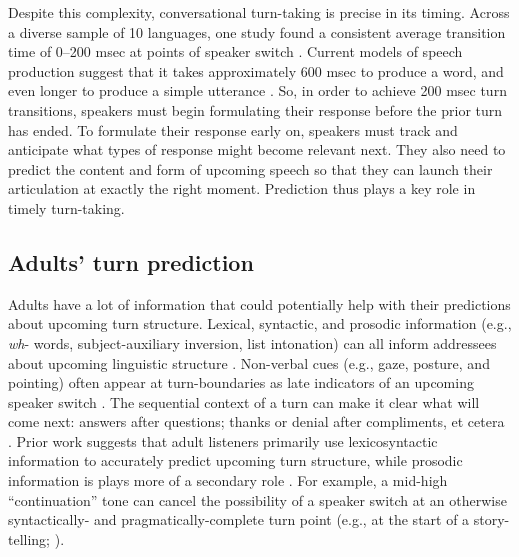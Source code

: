 \documentclass[authoryear, 12pt]{elsarticle}
\begin{document}
Despite this complexity, conversational turn-taking is precise in its timing. Across a diverse sample of 10 languages, one study found a consistent average transition time of 0--200 msec at points of speaker switch \citep{stivers2009}. Current models of speech production suggest that it takes approximately 600 msec to produce a word, and even longer to produce a simple utterance \citep{levelt1989}. So, in order to achieve 200 msec turn transitions, speakers must begin formulating their response before the prior turn has ended. To formulate their response early on, speakers must track and anticipate what types of response might become relevant next. They also need to predict the content and form of upcoming speech so that they can launch their articulation at exactly the right moment. Prediction thus plays a key role in timely turn-taking.

\subsection{Adults' turn prediction}

Adults have a lot of information that could potentially help with their predictions about upcoming turn structure. Lexical, syntactic, and prosodic information (e.g., \textit{wh}- words, subject-auxiliary inversion, list intonation) can all inform addressees about upcoming linguistic structure \citep{de-ruiter2006, duncan1972, ford1996, bogelsUndRev}. Non-verbal cues (e.g., gaze, posture, and pointing) often appear at turn-boundaries as late indicators of an upcoming speaker switch \citep{rossano2009, stivers2010}. The sequential context of a turn can make it clear what will come next: answers after questions; thanks or denial after compliments, et cetera \citep{schegloff2007}. Prior work suggests that adult listeners primarily use lexicosyntactic information to accurately predict upcoming turn structure, while prosodic information is plays more of a secondary role \citep{de-ruiter2006}. For example, a mid-high ``continuation'' tone can cancel the possibility of a speaker switch at an otherwise syntactically- and pragmatically-complete turn point (e.g., at the start of a story-telling; \citealp{ford1996, bogelsUndRev}).
\end{document}
